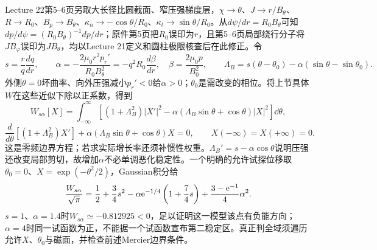 Lecture 22第5--6页另取大长径比圆截面、窄压强梯度层，$\chi\to\theta$、$J\to r/B_\theta$、$R\to R_0$、$B_p\to B_\theta$、$\kappa_n\to-\cos\theta/R_0$、$\kappa_t\to\sin\theta/R_0$。从$d\psi/dr=R_0B_\theta$可知$d p/d\psi=(R_0B_\theta)^{-1}dp/dr$；原件第5页把$R_0$误印为$r$，且第5--6页局部绕行分子将$JB_\varphi$误印为$JB_\theta$，均以Lecture 21定义和圆柱极限核查后在此修正。令
\begin{equation}
s=\frac r q\frac{dq}{dr},\qquad
\alpha=-\frac{2\mu_0r^2p_r'}{R_0B_\theta^2}
=-q^2R_0\frac{d\beta}{dr},\quad
\beta=\frac{2\mu_0p}{B_0^2},\qquad
\Lambda_B=s(\theta-\theta_0)-\alpha(\sin\theta-\sin\theta_0).
\end{equation}
外侧$\theta=0$坏曲率、向外压强减小$p_r'<0$给$\alpha>0$；$\theta_0$是需改变的相位。将上节具体$W$在这些近似下除以正系数，得到
\begin{equation}
W_{s\alpha}[X]=\int_{-\infty}^{\infty}
\left[(1+\Lambda_B^2)|X'|^2
-\alpha(\Lambda_B\sin\theta+\cos\theta)|X|^2\right]\dd\theta ,
\end{equation}
\begin{equation}
\boxed{\frac{d}{d\theta}\left[(1+\Lambda_B^2)X'\right]
+\alpha(\Lambda_B\sin\theta+\cos\theta)X=0},
\qquad X(-\infty)=X(+\infty)=0 .
\end{equation}
这是零频边界方程；若求实际增长率还须补惯性权重。$\Lambda_B'=s-\alpha\cos\theta$说明压强还改变局部剪切，故增加$\alpha$不必单调恶化稳定性。一个明确的允许试探位移取$\theta_0=0$、$X=\exp(-\theta^2/2)$，Gaussian积分给
\begin{equation}
\frac{W_{s\alpha}}{\sqrt\pi}
=\frac12+\frac34s^2-\alpha\mathrm e^{-1/4}\left(1+\frac74s\right)
+\frac{3-\mathrm e^{-1}}4\alpha^2.
\end{equation}
$s=1$、$\alpha=1.4$时$W_{s\alpha}\simeq-0.812925<0$，足以证明这一模型该点有负能方向；$\alpha=4$时同一试函数为正，不能据一个试函数宣布第二稳定区。真正判全域须遍历允许$X$、$\theta_0$与磁面，并检查前述Mercier边界条件。
